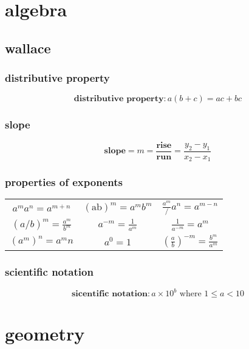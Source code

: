 \documentclass[a4paper,12pt]{article}
\author{m7tkr}
\begin{document}
\tableofcontents

\section{algebra}

\subsection{wallace}

\subsubsection{distributive property}

\[
\textbf{distributive property}: a(b+c)=ac+bc
\]

\subsubsection{slope}

\[
\textbf{slope}=\mathit{m}=\frac{\textbf{rise}}{\textbf{run}}=\frac{y_2-y_1}{x_2-x_1}
\]
\subsubsection{properties of exponents}

\begin{tabular}{ccc}
\( a^{m}a^n=a^{m+n} \) & \( (\mathrm{ab})^m=a^{m}b^{m} \) & \( \frac{a^m}/{a^n}=a^{m-n} \) \\
\( \left(a/b\right)^m=\frac{a^m}{b^m} \) & \( a^{-m}=\frac{1}{a^m} \) & \( \frac{1}{a^{-m}}=a^m \) \\
\( (a^m)^n=a^mn \) & \( a^0=1 \) & \(\left(\frac{a}{b}\right)^{-m}=\frac{b^m}{a^m} \)
\end{tabular}

\subsubsection{scientific notation}

\[
\textbf{sicentific notation}: a \times 10^b \textrm{ where }1 \leqslant a < 10
\]

\section{geometry}
\end{document}
